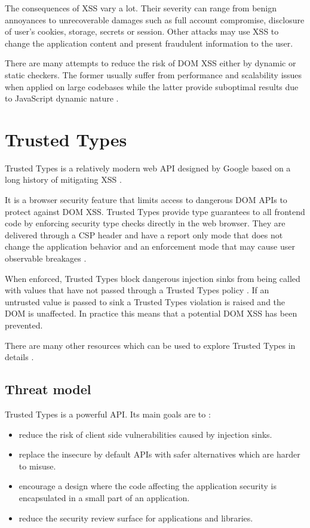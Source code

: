 The consequences of XSS vary a lot. Their severity can range from benign annoyances to unrecoverable
damages such as full account compromise, disclosure of user's cookies, storage, secrets or session.
Other attacks may use XSS to change the application content and present fraudulent information to the
user.

There are many attempts to reduce the risk of DOM XSS either by dynamic or static checkers. The
former usually suffer from performance and scalability issues when applied on large codebases while
the latter provide suboptimal results due to JavaScript dynamic nature
\cite{tt_web_framework_paper} \cite{owasp_xss_cheatsheet}.

\section{Trusted Types}

Trusted Types is a relatively modern web API designed by Google based on a long history of
mitigating XSS \cite{tt_design_history}.

It is a browser security feature that limits access to dangerous DOM APIs to protect against DOM
XSS. Trusted Types provide type guarantees to all frontend code by enforcing security type checks
directly in the web browser. They are delivered through a CSP header and have a report only mode
that does not change the application behavior and an enforcement mode that may cause user observable
breakages \cite{tt_background}.

When enforced, Trusted Types block dangerous injection sinks from being called with values that have
not passed through a Trusted Types policy \cite{tt_background}. If an untrusted value is passed to
sink a Trusted Types violation is raised and the DOM is unaffected. In practice this means that a
potential DOM XSS has been prevented.

There are many other resources which can be used to explore Trusted Types in details
\cite{tt_resources}.

\subsection{Threat model}

Trusted Types is a powerful API. Its main goals are to \cite{tt_spec:goals}:

\begin{itemize}
  \item reduce the risk of client side vulnerabilities caused by injection sinks.
  \item replace the insecure by default APIs with safer alternatives which are harder to misuse.
  \item encourage a design where the code affecting the application security is encapsulated in a
        small part of an application.
  \item reduce the security review surface for applications and libraries.
\end{itemize}

